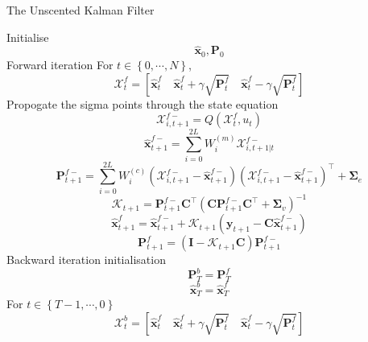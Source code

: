 \documentclass[12pt]{iopart}		%
\begin{document}
\begin{algorithm}
\caption{The Unscented Kalman Filter}\label{CPTEMDAlgorithm}
\begin{algorithmic}[1]
\State Initialise
\begin{equation*}
\hat{\mathbf x}_0, \mathbf P_0
\end{equation*}
\State Forward iteration
For $t \in \left\lbrace 0,\cdots, N\right\rbrace $,
\begin{equation*}
\mathcal X_t^f=[\hat{\mathbf x}_t^f \quad \hat{\mathbf x}_t^f+\gamma\sqrt{\mathbf P_t^f} \quad \hat{\mathbf x}_t^{f}-\gamma\sqrt{\mathbf P_t^f}]
\end{equation*}
Propogate the sigma points through the state equation
\begin{equation}
\mathcal X_{i,t+1}^{f-}=Q(\mathcal X_t^f,u_t)
\end{equation}
\begin{equation*}
 \hat{\mathbf x}_{t+1}^{f-}=\sum_{i=0}^{2L} W_i^{(m)}\mathcal X_{i,t+1|t}^{f-}
\end{equation*}
\begin{equation*}
 \mathbf P_{t +1}^{f-}=\sum_{i=0}^{2L} W_i^{(c)}(\mathcal X_{i,t+1}^{f-}-\hat{\mathbf x}_{t +1}^{f-})(\mathcal X_{i,t+1}^{f-}-\hat{\mathbf x}_{t +1}^{f-})^\top+\boldsymbol \Sigma_e
\end{equation*}
\begin{equation*}
\mathcal K_{t+1}=\mathbf P_{t +1}^{f-}\mathbf C ^\top(\mathbf C \mathbf P_{t +1}^{f-}\mathbf C ^\top+\boldsymbol \Sigma_v)^{-1}
\end{equation*}
\begin{equation*}
\hat{\mathbf x}_{t+1}^{f}=\hat{\mathbf x}_{t+1}^{f-}+\mathcal K_{t+1}(\mathbf y_{t+1}-\mathbf C\hat{\mathbf x}_{t +1}^{f-})
\end{equation*}
\begin{equation*}
 \mathbf P_{t+1}^f=(\mathbf I - \mathcal K_{t+1}\mathbf C)\mathbf P_{t +1}^{f-}
\end{equation*}
\State Backward iteration
\State initialisation
\begin{equation}
 \mathbf P_T^b= \mathbf P_T^f
\end{equation}
\begin{equation}
\hat{\mathbf x}^b_T= \hat{\mathbf x}^f_T
\end{equation}
For $t \in \left\lbrace T-1, \cdots, 0 \right\rbrace $
\begin{equation*}
\mathcal X_t^b=[\hat{\mathbf x}_t^f \quad \hat{\mathbf x}_t^f+\gamma\sqrt{\mathbf P_t^f} \quad \hat{\mathbf x}_t^f-\gamma\sqrt{\mathbf P_t^f}]

\end{equation*}
\end{algorithmic}
\end{algorithm}
\end{document}
